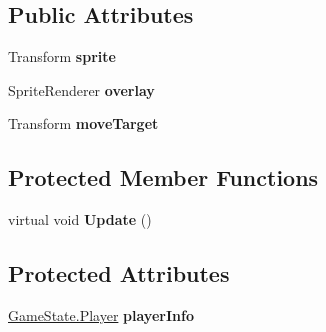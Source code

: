 \subsection*{Public Attributes}
\begin{DoxyCompactItemize}
\item 
\hypertarget{class_player_reference_a32979ccda155fe50f781e80c8bcfc5bd}{Transform {\bfseries sprite}}\label{class_player_reference_a32979ccda155fe50f781e80c8bcfc5bd}

\item 
\hypertarget{class_player_reference_a46a995f93fe98882b1a79d57b0baa66b}{Sprite\-Renderer {\bfseries overlay}}\label{class_player_reference_a46a995f93fe98882b1a79d57b0baa66b}

\item 
\hypertarget{class_player_reference_accd3ff8958657fee1e45aeb824b3e8e2}{Transform {\bfseries move\-Target}}\label{class_player_reference_accd3ff8958657fee1e45aeb824b3e8e2}

\end{DoxyCompactItemize}
\subsection*{Protected Member Functions}
\begin{DoxyCompactItemize}
\item 
\hypertarget{class_player_reference_ad75981d8a0e56d56370a27b9fcca1e91}{virtual void {\bfseries Update} ()}\label{class_player_reference_ad75981d8a0e56d56370a27b9fcca1e91}

\end{DoxyCompactItemize}
\subsection*{Protected Attributes}
\begin{DoxyCompactItemize}
\item 
\hypertarget{class_player_reference_abffbcb7165e1d2fbb37b536d87eca369}{\hyperlink{struct_game_state_1_1_player}{Game\-State.\-Player} {\bfseries player\-Info}}\label{class_player_reference_abffbcb7165e1d2fbb37b536d87eca369}

\end{DoxyCompactItemize}

